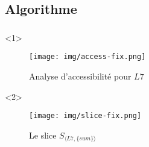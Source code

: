 \documentclass{beamer}
\begin{document}
    \subsection{Algorithme}
      \begin{frame}
        \frametitle{\subsecname}

        \begin{onlyenv}<1>
          \begin{figure}
            \centering
            \texttt{[image: img/access-fix.png]}
            \caption{Analyse d'accessibilité pour $L7$}
          \end{figure}
        \end{onlyenv}
            
        \begin{onlyenv}<2>
          \begin{figure}
            \centering
            \texttt{[image: img/slice-fix.png]}
            \caption{Le slice $S_{\langle L7, \{sum\} \rangle}$}
          \end{figure}
        \end{onlyenv}
      \end{frame}

      \appendix
      \addtocounter{part}{-1}




          
\end{document}
